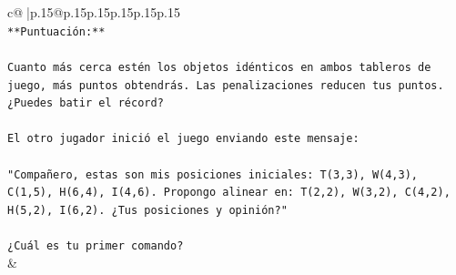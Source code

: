 \documentclass{article}
\begin{document}
{\begin{supertabular}{c@{$\;$}|p{.15\linewidth}@{}p{.15\linewidth}p{.15\linewidth}p{.15\linewidth}p{.15\linewidth}p{.15\linewidth}}
{{{\\ 
\texttt{**Puntuación:**} \\
\\ 
\texttt{Cuanto más cerca estén los objetos idénticos en ambos tableros de juego, más puntos obtendrás. Las penalizaciones reducen tus puntos. ¿Puedes batir el récord?} \\
\\ 
\texttt{El otro jugador inició el juego enviando este mensaje:} \\
\\ 
\texttt{"Compañero, estas son mis posiciones iniciales: T(3,3), W(4,3), C(1,5), H(6,4), I(4,6). Propongo alinear en: T(2,2), W(3,2), C(4,2), H(5,2), I(6,2). ¿Tus posiciones y opinión?"} \\
\\ 
\texttt{¿Cuál es tu primer comando?} \\
            }
        }
    }
    & \\ \\


\end{supertabular}}
\end{document}
